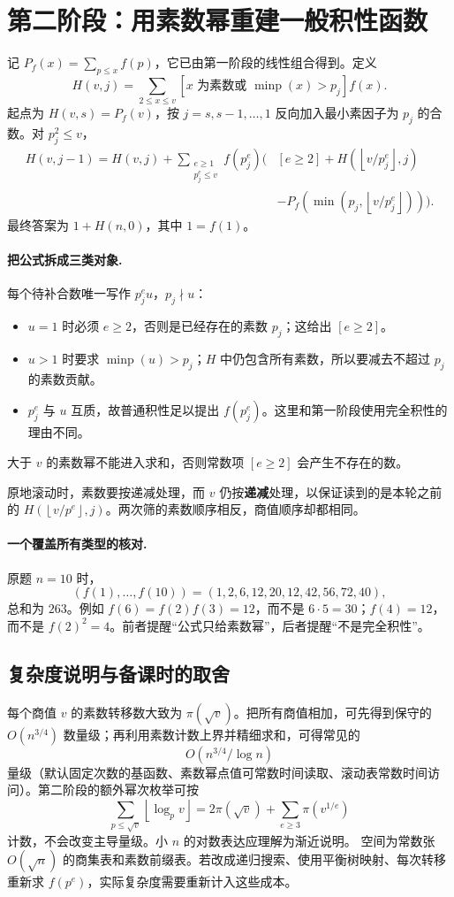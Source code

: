 \documentclass[UTF8,a4paper,11pt,oneside,openany,fontset=fandol]{ctexbook}
\theoremstyle{definition}
\newcommand{\floor}[1]{\left\lfloor #1\right\rfloor}
\begin{document}
\section{第二阶段：用素数幂重建一般积性函数}
记 $P_f(x)=\sum_{p\le x}f(p)$，它已由第一阶段的线性组合得到。定义
\[
 H(v,j)=\sum_{2\le x\le v}
 [x\text{ 为素数或 }\operatorname{minp}(x)>p_j]f(x).
\]
起点为 $H(v,s)=P_f(v)$，按 $j=s,s-1,\ldots,1$ 反向加入最小素因子为 $p_j$ 的合数。对 $p_j^2\le v$，
\[
\begin{aligned}
 H(v,j-1)=H(v,j)+\sum_{\substack{e\ge1\\p_j^e\le v}} f(p_j^e)
 \biggl(&[e\ge2]+H(\floor{v/p_j^e},j)\\
 &-P_f(\min(p_j,\floor{v/p_j^e}))\biggr).
\end{aligned}
\]
最终答案为 $1+H(n,0)$，其中 $1=f(1)$。


\paragraph{把公式拆成三类对象.}
每个待补合数唯一写作 $p_j^e u$，$p_j\nmid u$：
\begin{itemize}
\item $u=1$ 时必须 $e\ge2$，否则是已经存在的素数 $p_j$；这给出 $[e\ge2]$。
\item $u>1$ 时要求 $\operatorname{minp}(u)>p_j$；$H$ 中仍包含所有素数，所以要减去不超过 $p_j$ 的素数贡献。
\item $p_j^e$ 与 $u$ 互质，故普通积性足以提出 $f(p_j^e)$。这里和第一阶段使用完全积性的理由不同。
\end{itemize}
大于 $v$ 的素数幂不能进入求和，否则常数项 $[e\ge2]$ 会产生不存在的数。

原地滚动时，素数要按递减处理，而 $v$ 仍按\textbf{递减}处理，以保证读到的是本轮之前的 $H(\floor{v/p^e},j)$。两次筛的素数顺序相反，商值顺序却都相同。

\paragraph{一个覆盖所有类型的核对.}
原题 $n=10$ 时，
\[
(f(1),\ldots,f(10))=(1,2,6,12,20,12,42,56,72,40),
\]
总和为 $263$。例如 $f(6)=f(2)f(3)=12$，而不是 $6\cdot5=30$；$f(4)=12$，而不是 $f(2)^2=4$。前者提醒“公式只给素数幂”，后者提醒“不是完全积性”。

\subsection{复杂度说明与备课时的取舍}
每个商值 $v$ 的素数转移数大致为 $\pi(\sqrt v)$。把所有商值相加，可先得到保守的 $O(n^{3/4})$ 数量级；再利用素数计数上界并精细求和，可得常见的
\[
 O(n^{3/4}/\log n)
\]
量级（默认固定次数的基函数、素数幂点值可常数时间读取、滚动表常数时间访问）。第二阶段的额外幂次枚举可按
\[
 \sum_{p\le\sqrt v}\floor{\log_p v}
 =2\pi(\sqrt v)+\sum_{e\ge3}\pi(v^{1/e})
\]
计数，不会改变主导量级。小 $n$ 的对数表达应理解为渐近说明。
空间为常数张 $O(\sqrt n)$ 的商集表和素数前缀表。若改成递归搜索、使用平衡树映射、每次转移重新求 $f(p^e)$，实际复杂度需要重新计入这些成本。
\end{document}
